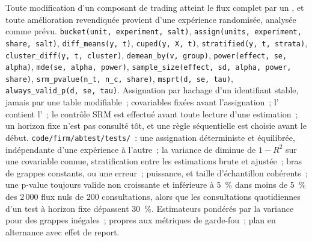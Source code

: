 \begin{build}
 Toute modification d'un composant de trading atteint le flux complet par un , et toute amélioration revendiquée provient d'une expérience randomisée,
analysée comme prévu.
 \texttt{bucket(unit, experiment, salt)}, \texttt{assign(units, experiment, share, salt)}, \texttt{diff\_means(y, t)},
\texttt{cuped(y, X, t)}, \texttt{stratified(y, t, strata)}, \texttt{cluster\_diff(y, t, cluster)}, \texttt{demean\_by(v, group)},
\texttt{power(effect, se, alpha)}, \texttt{mde(se, alpha, power)}, \texttt{sample\_size(effect, sd, alpha, power, share)},
\texttt{srm\_pvalue(n\_t, n\_c, share)}, \texttt{msprt(d, se, tau)}, \texttt{always\_valid\_p(d, se, tau)}.
 Assignation par hachage d'un identifiant stable, jamais par une table modifiable~; covariables fixées avant l'assignation~; l' contient
l'~; le contrôle SRM est effectué avant toute lecture d'une estimation~; un horizon fixe n'est pas consulté tôt, et une règle séquentielle est choisie avant le début.
 \texttt{code/firm/abtest/tests/}~: une assignation déterministe et équilibrée, indépendante d'une expérience à l'autre~; la variance de  diminue de
$1-R^2$ sur une covariable connue, stratification entre les estimations brute et ajustée~; bras de grappes constants, ou une erreur~; puissance,  et
taille d'échantillon cohérents~; une p-value toujours valide non croissante et inférieure à 5~\% dans moins de 5~\% des 2\,000 flux nuls de 200 consultations, alors que les consultations quotidiennes
d'un test à horizon fixe dépassent 30~\%.
 Estimateurs pondérés par la variance pour des grappes inégales~;  propres aux métriques de garde-fou~; plan en alternance avec effet de report.
\end{build}

